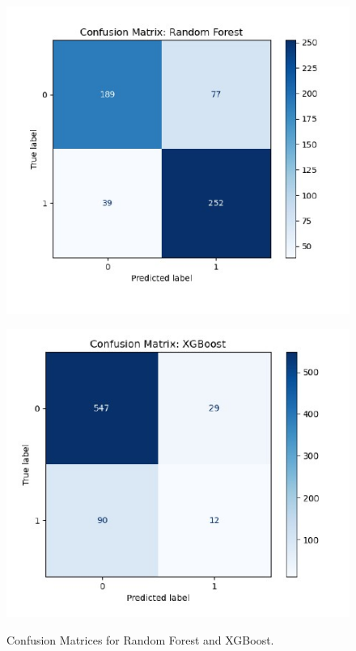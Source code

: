 \documentclass[conference]{IEEEtran}
\begin{document}
  \begin{figure}[H]
      \begin{minipage}{0.5\linewidth}
          \centering
          \includegraphics[width=\linewidth]{fig8.jpg}
          \label{fig8}
      \end{minipage}%
      \begin{minipage}{0.5\linewidth}
          \centering
          \includegraphics[width=\linewidth]{fig9.jpg}
          \label{fig9}
      \end{minipage}
      \caption{Confusion Matrices for Random Forest and XGBoost.}
  \end{figure}
  
\end{document}
